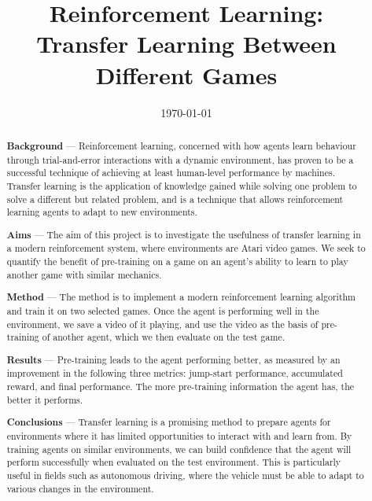 \documentclass[12pt,a4paper]{article}
\title{Reinforcement Learning: \\Transfer Learning Between Different Games}
\author{} %
\date{\today}
\begin{document}
\maketitle

\begin{abstract}

\begin{flushleft}
{\bf Background} --- Reinforcement learning, concerned with how agents learn behaviour through trial-and-error interactions with a dynamic environment, has proven to be a successful technique of achieving at least human-level performance by machines. Transfer learning is the application of knowledge gained while solving one problem to solve a different but related problem, and is a technique that allows reinforcement learning agents to adapt to new environments.
\end{flushleft}

\begin{flushleft}
{\bf Aims} --- The aim of this project is to investigate the usefulness of transfer learning in a modern reinforcement system, where environments are Atari video games. We seek to quantify the benefit of pre-training on a game on an agent's ability to learn to play another game with similar mechanics. 
\end{flushleft}

\begin{flushleft}
{\bf Method} --- The method is to implement a modern reinforcement learning algorithm and train it on two selected games. Once the agent is performing well in the environment, we save a video of it playing, and use the video as the basis of pre-training of another agent, which we then evaluate on the test game.    
\end{flushleft}

\begin{flushleft}
{\bf Results} --- Pre-training leads to the agent performing better, as measured by an improvement in the following three metrics: jump-start performance, accumulated reward, and final performance. The more pre-training information the agent has, the better it performs. 
\end{flushleft}

\begin{flushleft}
{\bf Conclusions} --- Transfer learning is a promising method to prepare agents for environments where it has limited opportunities to interact with and learn from. By training agents on similar environments, we can build confidence that the agent will perform successfully when evaluated on the test environment. This is particularly useful in fields such as autonomous driving, where the vehicle must be able to adapt to various changes in the environment.
\end{flushleft}

\end{abstract}
\end{document}
